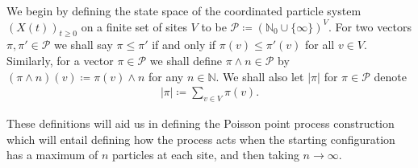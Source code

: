 \documentclass[11pt]{article}
\newtheorem{lemma}{Lemma}
\theoremstyle{definition}
\newcommand{\N}{\mathbb{N}}
\begin{document}
\noindent We begin by defining the state space of the coordinated particle system $(X(t))_{t \geq 0}$ on a finite set of sites $V$ to be $\mathcal{P} \coloneqq (\N_0 \cup \{\infty\})^V$. For two vectors $\pi,\pi' \in \mathcal{P}$ we shall say $\pi \leq \pi'$ if and only if $\pi(v) \leq \pi'(v)$ for all $v \in V$. Similarly, for a vector $\pi \in \mathcal{P}$ we shall define $\pi \wedge n \in \mathcal{P}$ by $(\pi \wedge n)(v) \coloneqq \pi(v) \wedge n$ for any $n \in \N$. We shall also let $|\pi|$ for $\pi \in \mathcal{P}$ denote
%
\begin{align*}
    |\pi| \coloneqq \sum_{v \in V} \pi(v).
\end{align*}

\noindent These definitions will aid us in defining the Poisson point process construction which will entail defining how the process acts when the starting configuration has a maximum of $n$ particles at each site, and then taking $n \to \infty$.
\medskip



    
\end{document}

